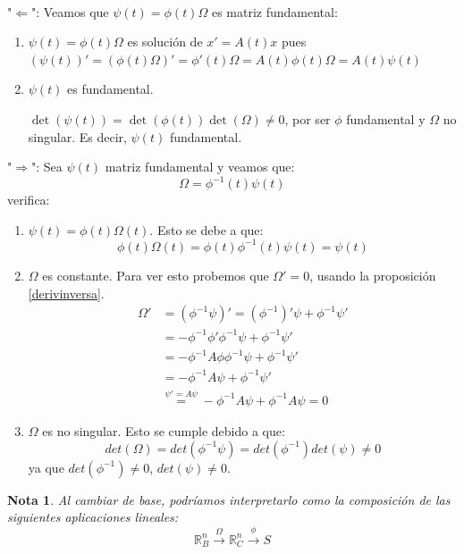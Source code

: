 \documentclass[11pt, a4paper,twoside]{article}
\makeatletter
\theoremstyle{theorem-style}  %
\renewenvironment{proof}[1][\proofname]{\par
	\pushQED{\qed}%
	\normalfont \topsep6\p@\@plus6\p@\relax
	\list{}{%
		\settowidth{\leftmargin}{\quad:\hskip\labelsep}%
		\setlength{\labelwidth}{0pt}%
		\setlength{\itemindent}{-\leftmargin}%
	}%
	\item[\hskip\labelsep\itshape#1\@addpunct{:}]\ignorespaces
}{%
	\popQED\endlist\@endpefalse
}
\theoremstyle{definition-style}
\newtheorem*{note}{Nota} %
\theoremstyle{example-style}
\makeatother
\begin{document}
\begin{proof}\ \\
	"$ \Leftarrow $": Veamos que $ \psi(t)=\phi(t)\varOmega $ es matriz fundamental:
	\begin{enumerate}[\quad i)]
		\item $ \psi(t)=\phi(t)\varOmega $ es solución de $ x'=A(t)x $ pues $ (\psi(t))'=(\phi(t)\varOmega)'=\phi'(t)\varOmega=A(t)\phi(t)\varOmega =A(t)\psi(t) $
		\item $ \psi(t) $ es fundamental.
		
		$ \det (\psi(t))=\det(\phi(t))\det(\varOmega)\neq 0 $, por ser $ \phi $ fundamental y $ \varOmega $ no singular. Es decir, $ \psi(t) $ fundamental.
	\end{enumerate}
	"$ \Rightarrow$": Sea $\psi (t)$ matriz fundamental y veamos que:
	\[\varOmega = \phi^{-1} (t) \psi(t)\]
	verifica:
	\begin{enumerate}
		\item  $\psi(t) = \phi(t) \varOmega(t)$. Esto se debe a que:
		\[\phi(t) \varOmega (t) = \phi(t) \phi^{-1}(t) \psi(t) = \psi(t) \]
		\item  $\varOmega$ es constante. Para ver esto probemos que $\varOmega' = 0$, usando la proposición \ref{derivinversa}.
		\begin{align*}
			\varOmega' &= (\phi^{-1} \psi)' = (\phi^{-1})'\psi + \phi^{-1}\psi' \\ 
			&= -\phi^{-1} \phi' \phi^{-1} \psi + \phi^{-1}\psi'\\
			&= -\phi^{-1} A \phi \phi^{-1} \psi + \phi^{-1} \psi'\\
			&= -\phi^{-1} A \psi + \phi^{-1} \psi' \\
			&\stackrel{\psi' = A \psi}{=} -\phi^{-1} A \psi + \phi^{-1} A \psi = 0
		\end{align*}
		\item  $\varOmega$ es no singular. Esto se cumple debido a que:
		\[det(\varOmega) = det(\phi^{-1} \psi) = det(\phi^{-1}) det(\psi) \neq 0\]
		ya que $det(\phi^{-1}) \neq 0$, $det(\psi) \neq 0$.
	\end{enumerate}
\end{proof}
\begin{note}
	Al cambiar de base, podríamos interpretarlo como la composición de las siguientes aplicaciones lineales:
	\[\mathbb{R}^n_{B}\xrightarrow{\varOmega} \mathbb{R}^n_{C} \xrightarrow{\phi}S \]
\end{note}
\end{document}
